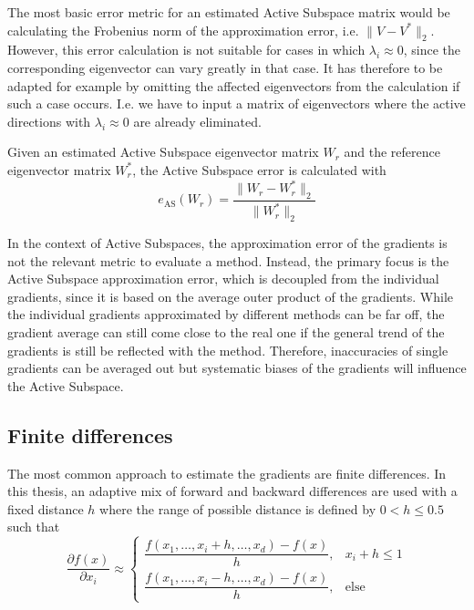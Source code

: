 \documentclass[
  a4paper,  %
  twoside,  %
  bibliography=totoc,
  headsepline,
  cleardoublepage=empty,
  parskip=half,
  draft=false
]{scrbook}
\begin{document}
The most basic error metric for an estimated Active Subspace matrix would be calculating the Frobenius norm of the approximation error, i.e. $\| V - V^* \|_2$.
However, this error calculation is not suitable for cases in which $\lambda_i \approx 0$, since the corresponding eigenvector can vary greatly in that case.
It has therefore to be adapted for example by omitting the affected eigenvectors from the calculation if such a case occurs.
I.e. we have to input a matrix of eigenvectors where the active directions with $\lambda_i \approx 0$ are already eliminated.

\begin{definition}
Given an estimated Active Subspace eigenvector matrix $W_r$ and the reference eigenvector matrix $W_r^*$, the
Active Subspace error is calculated with
\begin{equation}
e_{\text{AS}}(W_r)=\frac{\| W_r - W_r^* \|_2}{\| W_r^* \|_2}
\nonumber
\end{equation}
\end{definition}

In the context of Active Subspaces, the approximation error of the gradients is not the relevant metric to evaluate a method.
Instead, the primary focus is the Active Subspace approximation error, which is decoupled from the individual gradients, since it is based on the average outer product of the gradients.
While the individual gradients approximated by different methods can be far off, the gradient average can still come close to the real one if the general trend of the gradients is still be reflected with the method.
Therefore, inaccuracies of single gradients can be averaged out but systematic biases of the gradients will influence the Active Subspace.


\subsection{Finite differences}

The most common approach to estimate the gradients are finite differences.
In this thesis, an adaptive mix of forward and backward differences are used with a fixed distance $h$ where the range of possible distance is defined by $0 < h \leq 0.5$ such that
\begin{equation}
\frac{\partial f(x)}{\partial x_i} \approx
\begin{cases}
    \dfrac{f(x_1, \dots, x_i + h, \dots, x_d) - f(x)}{h}, & x_i + h \leq 1 \\[1.5em]
    \dfrac{f(x_1, \dots, x_i - h, \dots, x_d) - f(x)}{h}, & \text{else}
\end{cases}
\end{equation}
\end{document}
